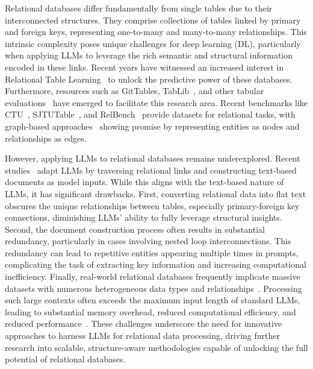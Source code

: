 \documentclass[11pt]{article}
\begin{document}
Relational databases differ fundamentally from single tables due to their interconnected structures. They comprise collections of tables linked by primary and foreign keys, representing one-to-many and many-to-many relationships. This intrinsic complexity poses unique challenges for deep learning (DL), particularly when applying LLMs to leverage the rich semantic and structural information encoded in these links. Recent years have witnessed an increased interest in Relational Table Learning~\citep{dvzeroski2010relational,zahradnik2023deep} to unlock the predictive power of these databases. Furthermore, resources such as GitTables, TabLib~\citep{eggert2023tablib}, and other tabular evaluations~\citep{gardner2024large} have emerged to facilitate this research area. 
Recent benchmarks like CTU~\citep{motl2015ctu}, SJTUTable~\citep{li2024rllm}, and RelBench~\citep{robinson2024relbench} provide datasets for relational tasks, with graph-based approaches~\citep{feyposition,robinson2024relbench} showing promise by representing entities as nodes and relationships as edges.

However, applying LLMs to relational databases remains underexplored. Recent studies~\citep{li2024rllm,wydmuch2024tackling} adapt LLMs by traversing relational links and constructing text-based documents as model inputs. While this aligns with the text-based nature of LLMs, it has significant drawbacks. First, converting relational data into flat text obscures the unique relationships between tables, especially primary-foreign key connections, diminishing LLMs' ability to fully leverage structural insights. Second, the document construction process often results in substantial redundancy, particularly in cases involving nested loop interconnections. This redundancy can lead to repetitive entities appearing multiple times in prompts, complicating the task of extracting key information and increasing computational inefficiency. Finally, real-world relational databases frequently implicate massive datasets with numerous heterogeneous data types and relationships~\citep{fey2023relational}. Processing such large contexts often exceeds the maximum input length of standard LLMs, leading to substantial memory overhead, reduced computational efficiency, and reduced performance~\citep{wang2024beyond}.
These challenges underscore the need for innovative approaches to harness LLMs for relational data processing, driving further research into scalable, structure-aware methodologies capable of unlocking the full potential of relational databases.
\end{document}
